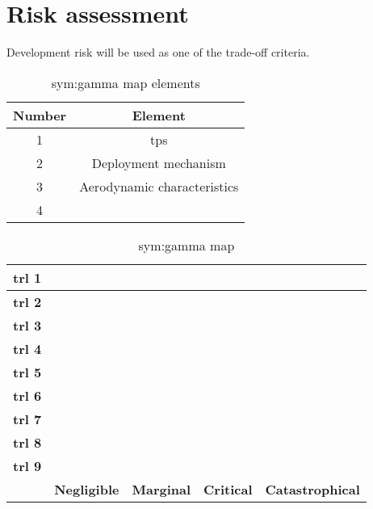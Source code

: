 \section{Risk assessment}
\label{ch:riskestimation}
Development risk will be used as one of the trade-off criteria. 

\begin{table}[h]
	\centering
	\caption{\gls{sym:gamma} map elements}
	\label{tab:riskmapelements}
	\begin{tabular}{|c|c|}
		\hline 
		\textbf{Number} & \textbf{Element} \\ \hline \hline
		1 & \acrlong{tps} \\
		2 & Deployment mechanism \\
		3 & Aerodynamic characteristics \\
		4 & \\
		\hline
	\end{tabular}
\end{table}

\begin{table}[H]
	\caption{\gls{sym:gamma} map}
	\label{tab:riskmap}
	\begin{tabular}{|c|c|c|c|c|} %
		\hline
		\textbf{\gls{trl} 1} & \cellcolor{green} & \cellcolor{yellow} & \cellcolor{red} & \cellcolor{red} \\ \hline
		\textbf{\gls{trl} 2} & \cellcolor{green} & \cellcolor{yellow} & \cellcolor{red} & \cellcolor{red} \\ \hline
		\textbf{\gls{trl} 3} & \cellcolor{green} & \cellcolor{yellow} & \cellcolor{red} & \cellcolor{red} \\ \hline
		\textbf{\gls{trl} 4} & \cellcolor{green} & \cellcolor{yellow} & \cellcolor{yellow} & \cellcolor{yellow} \\ \hline
		\textbf{\gls{trl} 5} & \cellcolor{green} & \cellcolor{green} & \cellcolor{yellow} & \cellcolor{yellow} \\ \hline
		\textbf{\gls{trl} 6} & \cellcolor{green} & \cellcolor{green} & \cellcolor{green} & \cellcolor{green} \\ \hline
		\textbf{\gls{trl} 7} & \cellcolor{green} & \cellcolor{green} & \cellcolor{green} & \cellcolor{green} \\ \hline
		\textbf{\gls{trl} 8} & \cellcolor{green} & \cellcolor{green} & \cellcolor{green} & \cellcolor{green} \\ \hline
		\textbf{\gls{trl} 9} & \cellcolor{green} & \cellcolor{green} & \cellcolor{green} & \cellcolor{green} \\ \hline
		 & \textbf{Negligible} & \textbf{Marginal} & \textbf{Critical} & \textbf{Catastrophical} \\ \hline
	\end{tabular}
\end{table}

